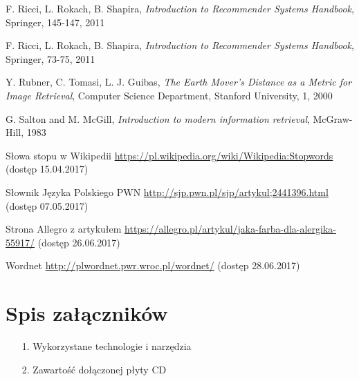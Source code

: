 \documentclass[pl]{minipw} %
\begin{document}
\begin{thebibliography}{30}
		F. Ricci, L. Rokach, B. Shapira,
		\emph{Introduction to Recommender Systems Handbook},
		Springer,
		145-147,
		2011
		
		F. Ricci, L. Rokach, B. Shapira,
		\emph{Introduction to Recommender Systems Handbook},
		Springer,
		73-75,
		2011
	
		Y. Rubner, C. Tomasi, L. J. Guibas,
		\emph{The Earth Mover's Distance as a Metric for Image Retrieval},
		Computer Science Department, Stanford University,
		1,
		2000	

		G. Salton and M. McGill,
		\emph{Introduction to modern information retrieval},
		McGraw-Hill,
		1983
	
		Słowa stopu w Wikipedii
		\url{https://pl.wikipedia.org/wiki/Wikipedia:Stopwords}
		(dostęp 15.04.2017)
	
		Słownik Języka Polskiego PWN
		\url{http://sjp.pwn.pl/sjp/artykul;2441396.html}
		(dostęp 07.05.2017)
	
		Strona Allegro z artykułem
		\url{https://allegro.pl/artykul/jaka-farba-dla-alergika-55917/}
		(dostęp 26.06.2017)
		
		Wordnet
		\url{http://plwordnet.pwr.wroc.pl/wordnet/}
		(dostęp 28.06.2017)
\end{thebibliography}






\listoffigures


\renewcommand{\listtablename}{Spis tabel}
\listoftables


\chapter*{Spis załączników}
\begin{enumerate}
\item[1.] Wykorzystane technologie i narzędzia
\item[2.] Zawartość dołączonej płyty CD
\end{enumerate}
\end{document}
